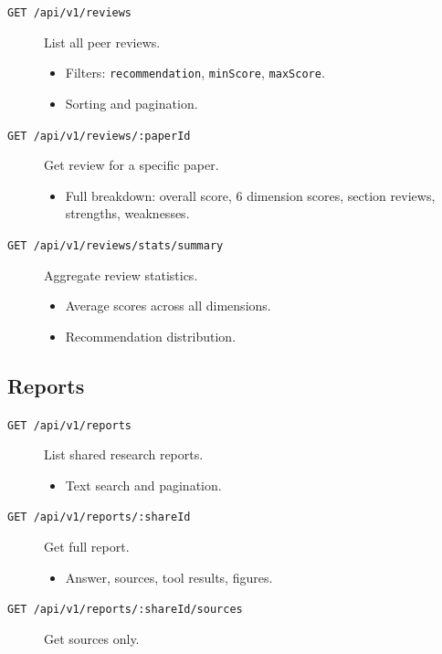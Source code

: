 \begin{description}
  \item[\texttt{GET /api/v1/reviews}] List all peer reviews.
  \begin{itemize}
    \item Filters: \texttt{recommendation}, \texttt{minScore}, \texttt{maxScore}.
    \item Sorting and pagination.
  \end{itemize}

  \item[\texttt{GET /api/v1/reviews/:paperId}] Get review for a specific paper.
  \begin{itemize}
    \item Full breakdown: overall score, 6 dimension scores, section reviews, strengths, weaknesses.
  \end{itemize}

  \item[\texttt{GET /api/v1/reviews/stats/summary}] Aggregate review statistics.
  \begin{itemize}
    \item Average scores across all dimensions.
    \item Recommendation distribution.
  \end{itemize}
\end{description}

\subsection{Reports}

\begin{description}
  \item[\texttt{GET /api/v1/reports}] List shared research reports.
  \begin{itemize}
    \item Text search and pagination.
  \end{itemize}

  \item[\texttt{GET /api/v1/reports/:shareId}] Get full report.
  \begin{itemize}
    \item Answer, sources, tool results, figures.
  \end{itemize}

  \item[\texttt{GET /api/v1/reports/:shareId/sources}] Get sources only.
\end{description}

